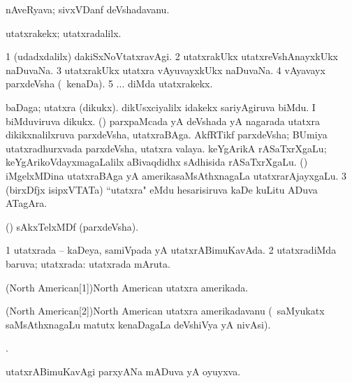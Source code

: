 \bentry
{}
\gl{\nA}
\bmng
nAveRyava; sivxVDanf deVshadavanu. 
\emng
\eentry

\bentry
{}
\gl{\kirxvi}
\bmng
utatxrakekx; utatxradalilx. 
\emng

\noindent
\gl{\pagu}
\bmng
\bnum
\num{1} (udadxdalilx) dakiSxNoVtatxravAgi. 
\num{2}  utatxrakUkx utatxreVshAnayxkUkx naDuvaNa. 
\num{3}  utatxrakUkx utatxra vAyuvayxkUkx naDuvaNa. 
\num{4}  vAyavayx parxdeVsha (\kanmu\ kenaDa). 
\num{5} ... diMda utatxrakekx. 
\enum
\emng
\eentry

\bentry
{}
\gl{\nA}
\bmng
\bnum
{} 
\banum
{} baDaga; utatxra (dikukx). 
 dikUsxciyalilx idakekx sariyAgiruva biMdu. 
 I biMduviruva dikukx. 
\eanum
\numie
{} (\sA {}) 
\banum
{} parxpaMcada yA deVshada yA nagarada utatxra dikikxnalilxruva parxdeVsha, utatxraBAga. 
 AkfRTikf parxdeVsha; BUmiya utatxradhurxvada parxdeVsha, utatxra valaya. 
 keYgArikA rASaTxrXgaLu; keYgArikoVdayxmagaLalilx aBivaqdidhx sAdhisida rASaTxrXgaLu. 
 (\kanmu) iMgelxMDina utatxraBAga yA amerikasaMsAthxnagaLa utatxrarAjayxgaLu. 
\eanum
\numie
\num{3} (birxDfjx isipxVTATa) ``utatxra" eMdu hesarisiruva kaDe kuLitu ADuva ATagAra. 
\enum
\emng

\noindent
\gl{\pagu}
\bmng
{} (\pArxparx) sAkxTelxMDf (parxdeVsha). 
\emng
\eentry

\bentry
{}
\gl{\gu}
\bmng
\bnum
\num{1} utatxrada -- kaDeya, samiVpada yA utatxrABimuKavAda. 
\num{2} utatxradiMda baruva; utatxrada:  utatxrada mAruta. 
\enum
\emng
\eentry

\bentry
\word(North American[1]){North American}
\gl{\gu}
\bmng
utatxra amerikada. 
\emng
\eentry

\bentry
\word(North American[2]){North American}
\gl{\nA}
\bmng
utatxra amerikadavanu (\kanmu\ saMyukatx saMsAthxnagaLu matutx kenaDagaLa deVshiVya yA nivAsi). 
\emng
\eentry

\bentry
{}
\gl{\saMkiSx}
\bmng
{}. 
\emng
\eentry

\bentry
{}
\gl{\gu}
\bmng
utatxrABimuKavAgi parxyANa mADuva yA oyuyxva. 
\emng
\eentry

